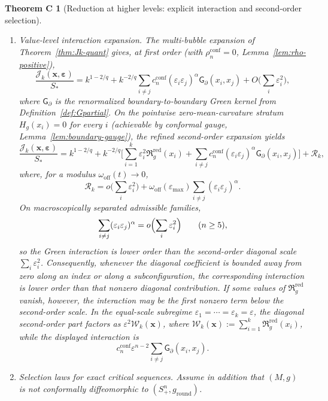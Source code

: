 \documentclass[11pt,reqno,a4paper]{amsart}
\numberwithin{equation}{section}
\theoremstyle{plain}
\theoremstyle{remark}
\theoremstyle{plain}
\newtheorem*{thmC}{Theorem C}
\begin{document}
\begin{thmC}[Reduction at higher levels: explicit interaction and second-order selection]
\begin{enumerate}[label=\textup{(\alph*)},leftmargin=1.5em]
\item \emph{Value-level interaction expansion.}
The multi-bubble expansion of Theorem~\ref{thm:Jk-quant} gives, at first order
(with $\rho_n^{\mathrm{conf}}=0$, Lemma~\ref{lem:rho-positive}),
\[
\frac{\mathcal J_k(\mathbf x,\boldsymbol\varepsilon)}{S_\ast}
= k^{1-2/q}
+ k^{-2/q}
\sum_{i\neq j} c_n^{\mathrm{conf}}(\varepsilon_i\varepsilon_j)^\alpha\mathsf G_\partial(x_i,x_j)
+ O\Big(\sum_i\varepsilon_i^2\Big),
\]
where $\mathsf G_\partial$ is the renormalized boundary-to-boundary Green kernel from Definition~\ref{def:Gpartial}.
On the pointwise zero-mean-curvature stratum $H_g(x_i)=0$ for every $i$
(achievable by conformal gauge, Lemma~\ref{lem:boundary-gauge}),
the refined second-order expansion yields
\begin{equation}\label{eq:intro-reduction-Jk}
\frac{\mathcal J_k(\mathbf x,\boldsymbol\varepsilon)}{S_\ast}
= k^{1-2/q}
+ k^{-2/q}\Bigg[
\sum_{i=1}^k \varepsilon_i^2\mathfrak R_g^{\mathrm{red}}(x_i)
+ \sum_{i\neq j} c_n^{\mathrm{conf}}(\varepsilon_i\varepsilon_j)^\alpha\mathsf G_\partial(x_i,x_j)
\Bigg]
+ \mathcal R_k,
\end{equation}
where, for a modulus $\omega_{\mathrm{off}}(t)\to0$,
\[
\mathcal R_k
=
o\bigl(\sum_i\varepsilon_i^2\bigr)
+
\omega_{\mathrm{off}}(\varepsilon_{\max})
\sum_{i\neq j}(\varepsilon_i\varepsilon_j)^\alpha .
\]
On macroscopically separated admissible families,
\[
\sum_{i\neq j}(\varepsilon_i\varepsilon_j)^\alpha
=o\Bigl(\sum_i\varepsilon_i^2\Bigr)
\qquad(n\ge5),
\]
so the Green interaction is lower order than the second-order diagonal \emph{scale}
$\sum_i\varepsilon_i^2$.  Consequently, whenever the diagonal coefficient is bounded away from zero along
an index or along a subconfiguration, the corresponding interaction is lower order than that nonzero diagonal
contribution.  If some values of $\mathfrak R_g^{\mathrm{red}}$ vanish, however, the interaction may be the first
nonzero term below the second-order scale.  In the equal-scale subregime
$\varepsilon_1=\cdots=\varepsilon_k=\varepsilon$, the diagonal second-order part factors as
$\varepsilon^2\mathcal W_k(\mathbf x)$, where
$\mathcal W_k(\mathbf x):=\sum_{i=1}^k\mathfrak R_g^{\mathrm{red}}(x_i)$, while the displayed interaction is
\[
 c_n^{\mathrm{conf}}\varepsilon^{n-2}
 \sum_{i\ne j}\mathsf G_\partial(x_i,x_j).
\]

\item \emph{Selection laws for exact critical sequences.}
Assume in addition that $(M,g)$ is not conformally diffeomorphic to $(S^n_+,g_{\mathrm{round}})$.


\end{enumerate}
\end{thmC}
\end{document}
